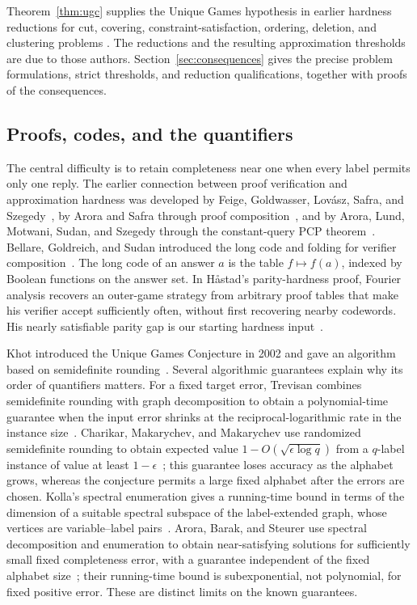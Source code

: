 Theorem~\ref{thm:ugc} supplies the Unique Games hypothesis in earlier
hardness reductions for cut, covering, constraint-satisfaction, ordering,
deletion, and clustering problems
\cite{KKMO07,KhotRegev2008,Raghavendra08,GuruswamiEtAl2011OrderingCSP,CKKRS2006,DemaineEtAl2006Clustering}.
The reductions and the resulting approximation thresholds are due to
those authors. Section~\ref{sec:consequences} gives the precise problem
formulations, strict thresholds, and reduction qualifications, together
with proofs of the consequences.

\subsection{Proofs, codes, and the quantifiers}

The central difficulty is to retain completeness near one when every
label permits only one reply. The earlier connection between proof
verification and approximation hardness was developed by Feige,
Goldwasser, Lov\'asz, Safra, and Szegedy~\cite{FGLSS96}, by Arora and
Safra through proof composition~\cite{AroraSafra98}, and by Arora,
Lund, Motwani, Sudan, and Szegedy through the constant-query PCP
theorem~\cite{ALMSS98}. Bellare, Goldreich, and Sudan introduced the
long code and folding for verifier composition~\cite[Section~3.3]{BGS98}.
The long code of an answer \(a\) is the table \(f\mapsto f(a)\),
indexed by Boolean functions on the answer set. In H\aa stad's
parity-hardness proof, Fourier analysis recovers an outer-game strategy
from arbitrary proof tables that make his verifier accept sufficiently
often, without first recovering nearby codewords. His nearly satisfiable
parity gap is our starting hardness input~\cite{Hastad01}.

Khot introduced the Unique Games Conjecture in 2002 and gave an algorithm
based on semidefinite rounding~\cite{Khot02}.
Several algorithmic guarantees explain why its order of quantifiers
matters. For a fixed target error, Trevisan combines semidefinite rounding
with graph decomposition to obtain a polynomial-time
guarantee when the input error shrinks at the reciprocal-logarithmic
rate in the instance size~\cite{Trevisan08}. Charikar, Makarychev, and
Makarychev use randomized semidefinite rounding to obtain expected value
\(1-O(\sqrt{\epsilon\log q})\) from
a \(q\)-label instance of value at least \(1-\epsilon\)~\cite{CMM06};
this guarantee loses accuracy as the alphabet grows, whereas the
conjecture permits a large fixed alphabet after the errors are chosen.
Kolla's spectral enumeration gives a running-time bound in terms of the
dimension of a suitable spectral subspace of the label-extended graph,
whose vertices are variable--label pairs~\cite{Kolla11}. Arora, Barak, and Steurer use
spectral decomposition and enumeration to obtain near-satisfying
solutions for sufficiently small fixed completeness error, with a
guarantee independent of the fixed alphabet size~\cite{ABS10}; their
running-time bound is subexponential, not polynomial, for fixed positive
error. These are distinct limits on the known guarantees.

